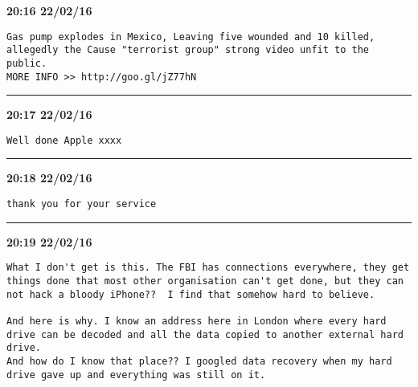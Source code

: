\begin{adjustwidth}{0cm}{0cm}
\footnotesize \textbf{20:16 22/02/16}

\begin{lstlisting}[breaklines, breakatwhitespace, basicstyle=\small, frame=leftline]
Gas pump explodes in Mexico, Leaving five wounded and 10 killed, allegedly the Cause "terrorist group" strong video unfit to the public.
MORE INFO >> http://goo.gl/jZ77hN
\end{lstlisting}
\end{adjustwidth}

\hrule%

\begin{adjustwidth}{0cm}{0cm}
\footnotesize \textbf{20:17 22/02/16}

\begin{lstlisting}[breaklines, breakatwhitespace, basicstyle=\small, frame=leftline]
Well done Apple xxxx
\end{lstlisting}
\end{adjustwidth}

\hrule%

\begin{adjustwidth}{0cm}{0cm}
\footnotesize \textbf{20:18 22/02/16}

\begin{lstlisting}[breaklines, breakatwhitespace, basicstyle=\small, frame=leftline]
thank you for your service
\end{lstlisting}
\end{adjustwidth}

\hrule%

\begin{adjustwidth}{0cm}{0cm}
\footnotesize \textbf{20:19 22/02/16}

\begin{lstlisting}[breaklines, breakatwhitespace, basicstyle=\small, frame=leftline]
What I don't get is this. The FBI has connections everywhere, they get things done that most other organisation can't get done, but they can not hack a bloody iPhone??  I find that somehow hard to believe. 

And here is why. I know an address here in London where every hard drive can be decoded and all the data copied to another external hard drive. 
And how do I know that place?? I googled data recovery when my hard drive gave up and everything was still on it.
\end{lstlisting}
\end{adjustwidth}

